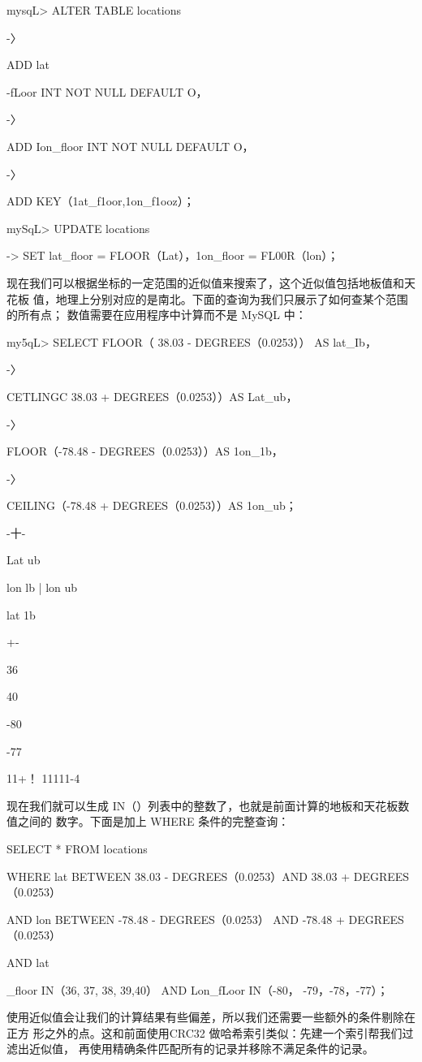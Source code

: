 mysqL> ALTER TABLE locations

-〉

ADD lat

-fLoor INT NOT NULL DEFAULT O，

-〉

ADD Ion\_floor INT NOT NULL DEFAULT O，

-〉

ADD KEY（1at\_f1oor,1on\_f1ooz）；

mySqL> UPDATE locations

-> SET lat\_floor = FLOOR（Lat），1on\_floor = FL00R（lon）；

现在我们可以根据坐标的一定范围的近似值来搜索了，这个近似值包括地板值和天花板
值，地理上分别对应的是南北。下面的查询为我们只展示了如何查某个范围的所有点；
数值需要在应用程序中计算而不是 MySQL 中：

my5qL> SELECT FLOOR（ 38.03 - DEGREES（0.0253）） AS lat\_Ib，

-〉

CETLINGC 38.03 + DEGREES（0.0253））AS Lat\_ub，

-〉

FLOOR（-78.48 - DEGREES（0.0253））AS 1on\_1b，

-〉

CEILING（-78.48 + DEGREES（0.0253））AS 1on\_ub；

-十-

Lat ub

lon lb | lon ub

lat 1b

+-

36

40

-80

-77

11+！ 11111-4

现在我们就可以生成 IN（）列表中的整数了，也就是前面计算的地板和天花板数值之间的
数字。下面是加上 WHERE 条件的完整查询：

SELECT * FROM locations

WHERE lat BETWEEN 38.03 - DEGREES（0.0253）AND 38.03 + DEGREES（0.0253）

AND lon BETWEEN -78.48 - DEGREES（0.0253） AND -78.48 + DEGREES（0.0253）

AND lat

\_floor IN（36, 37, 38, 39,40） AND Lon\_fLoor IN（-80， -79，-78，-77）；

使用近似值会让我们的计算结果有些偏差，所以我们还需要一些额外的条件剔除在正方
形之外的点。这和前面使用CRC32 做哈希索引类似：先建一个索引帮我们过滤出近似值，
再使用精确条件匹配所有的记录并移除不满足条件的记录。

